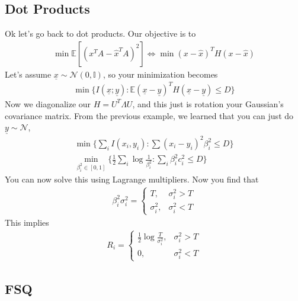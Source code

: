 \subsection{Dot Products}
Ok let's go back to dot products. Our objective is to
\begin{align}
	\min \mathbb E[(x^T A - \hat x^T A)^2] \iff \min (x-\hat x)^T H (x - \hat x)
\end{align}
Let's assume $\underline x \sim \mathcal N(0, \mathbb I)$, so your minimization becomes
\begin{align}
	\min \{ I(\underline x; \underline y) : \mathbb E(\underline x - \underline y)^T H (\underline x - \underline y ) \leq D\}
\end{align}
Now we diagonalize our $H = U^T \Lambda U$, and this just is rotation your Gaussian's covariance matrix. From the previous example, we learned that you can just do $\underline y \sim \mathcal N$,
\begin{align}
	\min \{\sum_i I(x_i, y_i) : \sum(x_i -y_i )^2 \beta_i^2 \leq D \}\\
	\min_{\beta_i^2 \in [0,1]} \{ \frac{1}{2} \sum_i \log \frac{1}{\beta^2_i} : \sum_i \beta_i^2 c_i^2 \leq D\}
\end{align}
You can now solve this using Lagrange multipliers.  Now you find that
\begin{align}
	\beta_i^2 \sigma_i^2 = \begin{cases}
		T, & \sigma_i^2 > T\\
		\sigma_i^2 , &\sigma^2_i < T
	\end{cases}
\end{align}
This implies 
\begin{align}
	R_i = \begin{cases}
		\frac{1}{2} \log \frac{T}{\sigma_i^2}, & \sigma_i^2 > T \\ 0, &\sigma^2_i < T
	\end{cases}
\end{align}




\subsection{FSQ}










